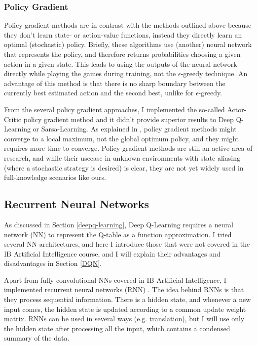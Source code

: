 \subsubsection{Policy Gradient}

Policy gradient methods are in contrast with the methods outlined above because they don't learn state- or action-value functions, instead they directly learn an optimal (stochastic) policy. Briefly, these algorithms use (another) neural network that represents the policy, and therefore returns probabilities choosing a given action in a given state. This leads to using the outputs of the neural network directly while playing the games during training, not the $\epsilon$-greedy technique. An advantage of this method is that there is no sharp boundary between the currently best estimated action and the second best, unlike for $\epsilon$-greedy. 



From the several policy gradient approaches, I implemented the so-called Actor-Critic policy gradient method and it didn't provide superior results to Deep Q-Learning or Sarsa-Learning. As explained in \cite{bhandari2019policygradientconvergence}, policy gradient methods might converge to a local maximum, not the global optimum policy, and they might requires more time to converge. Policy gradient methods are still an active area of research, and while their usecase in unknown environments with state aliasing (where a stochastic strategy is desired) is clear, they are not yet widely used in full-knowledge scenarios like ours.


\subsection{Recurrent Neural Networks}


As discussed in Section \ref{deepq-learning}, Deep Q-Learning requires a neural network (NN) to represent the Q-table as a function approximation. I tried several NN architectures, and here I introduce those that were not covered in the IB Artificial Intelligence course, and I will explain their advantages and disadvantages in Section \ref{DQN}. 

Apart from fully-convolutional NNs covered in IB Artificial Intelligence, I implemented recurrent neural networks (RNN) \cite{hopfield1982RNNoriginal}. The idea behind RNNs is that they process sequential information. There is a hidden state, and whenever a new input comes, the hidden state is updated according to a common update weight matrix. RNNs can be used in several ways (e.g. translation), but I will use only the hidden state after processing all the input, which contains a condensed summary of the data.


